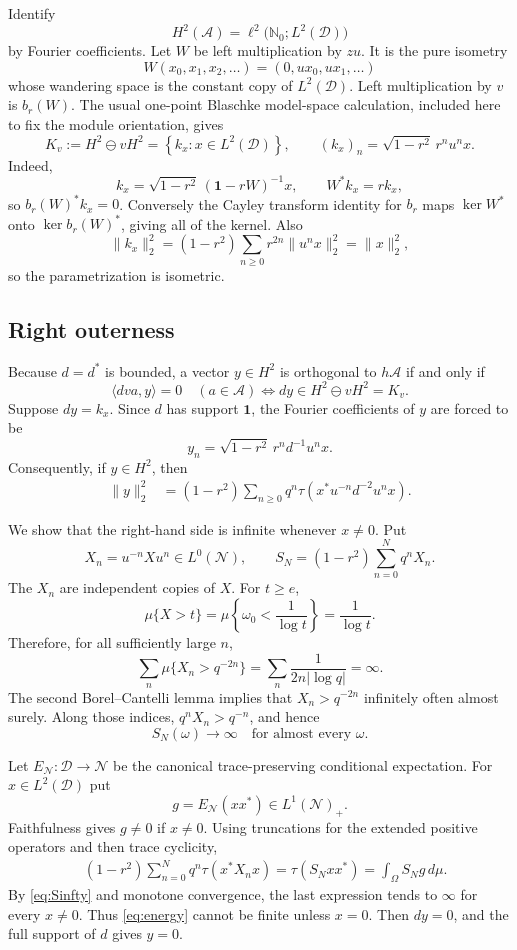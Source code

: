 \documentclass[11pt]{article}
\newcommand{\A}{\mathcal A}
\newcommand{\D}{\mathcal D}
\newcommand{\N}{\mathcal N}
\newcommand{\one}{\mathbf 1}
\begin{document}
Identify
\[
 H^2(\A)=\ell^2\bigl(\mathbb N_0;L^2(\D)\bigr)
\]
by Fourier coefficients.  Let $W$ be left multiplication by $zu$.  It is the
pure isometry
\[
 W(x_0,x_1,x_2,\ldots)=(0,ux_0,ux_1,\ldots)
\]
whose wandering space is the constant copy of $L^2(\D)$.  Left multiplication
by $v$ is $b_r(W)$.  The usual one-point Blaschke model-space calculation,
included here to fix the module orientation, gives
\begin{equation}\label{eq:model}
 K_v:=H^2\ominus vH^2
 =\left\{k_x:x\in L^2(\D)\right\},
 \qquad
 (k_x)_n=\sqrt{1-r^2}\,r^n u^n x.
\end{equation}
Indeed,
\[
 k_x=\sqrt{1-r^2}\,(\one-rW)^{-1}x,
 \qquad W^*k_x=rk_x,
\]
so $b_r(W)^*k_x=0$.  Conversely the Cayley transform identity for $b_r$
maps $\ker W^*$ onto $\ker b_r(W)^*$, giving all of the kernel.  Also
\[
 \|k_x\|_2^2=(1-r^2)\sum_{n\geq0}r^{2n}\|u^nx\|_2^2=\|x\|_2^2,
\]
so the parametrization is isometric.

\subsection{Right outerness}

Because $d=d^*$ is bounded, a vector $y\in H^2$ is orthogonal to $h\A$ if
and only if
\[
 \langle dva,y\rangle=0\quad(a\in\A)
 \iff dy\in H^2\ominus vH^2=K_v.
\]
Suppose $dy=k_x$.  Since $d$ has support $\one$, the Fourier coefficients of
$y$ are forced to be
\[
 y_n=\sqrt{1-r^2}\,r^n d^{-1}u^nx.
\]
Consequently, if $y\in H^2$, then
\begin{align}
 \|y\|_2^2
 &=(1-r^2)\sum_{n\geq0}q^n
   \tau\!\left(x^*u^{-n}d^{-2}u^nx\right).\label{eq:energy}
\end{align}

We show that the right-hand side is infinite whenever $x\neq0$.  Put
\[
 X_n=u^{-n}Xu^n\in L^0(\N),
 \qquad
 S_N=(1-r^2)\sum_{n=0}^Nq^nX_n.
\]
The $X_n$ are independent copies of $X$.  For $t\geq e$,
\[
 \mu\{X>t\}
 =\mu\left\{\omega_0<\frac1{\log t}\right\}
 =\frac1{\log t}.
\]
Therefore, for all sufficiently large $n$,
\[
 \sum_n\mu\{X_n>q^{-2n}\}
 =\sum_n\frac1{2n|\log q|}=\infty.
\]
The second Borel--Cantelli lemma implies that $X_n>q^{-2n}$ infinitely often
almost surely.  Along those indices, $q^nX_n>q^{-n}$, and hence
\begin{equation}\label{eq:Sinfty}
 S_N(\omega)\longrightarrow\infty
 \quad\text{for almost every }\omega.
\end{equation}

Let $E_{\N}:\D\to\N$ be the canonical trace-preserving conditional
expectation.  For $x\in L^2(\D)$ put
\[
 g=E_{\N}(xx^*)\in L^1(\N)_+.
\]
Faithfulness gives $g\neq0$ if $x\neq0$.  Using truncations for the extended
positive operators and then trace cyclicity,
\begin{align*}
 &(1-r^2)\sum_{n=0}^Nq^n
   \tau\!\left(x^*X_nx\right)
   =\tau(S_Nxx^*)
   =\int_\Omega S_N g\,d\mu.
\end{align*}
By \eqref{eq:Sinfty} and monotone convergence, the last expression tends to
$\infty$ for every $x\neq0$.  Thus \eqref{eq:energy} cannot be finite unless
$x=0$.  Then $dy=0$, and the full support of $d$ gives $y=0$.
\end{document}
